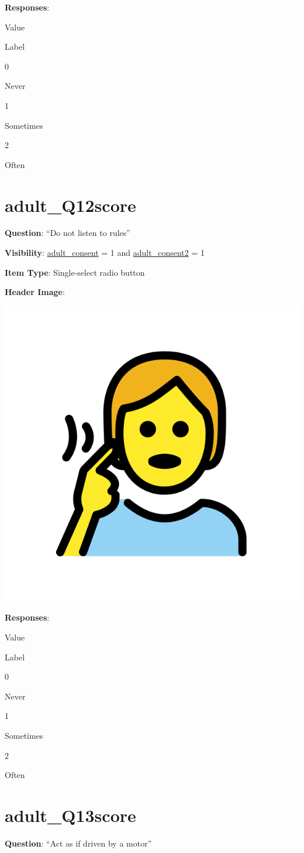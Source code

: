\documentclass[]{book}
\begin{document}
\textbf{Responses}:

Value

Label

0

Never

1

Sometimes

2

Often

\hypertarget{adult_q12score}{%
\section{adult\_Q12score}\label{adult_q12score}}

\textbf{Question}: ``Do not listen to rules''

\textbf{Visibility}: \protect\hyperlink{adult_consent}{adult\_consent} = 1 and \protect\hyperlink{adult_consent2}{adult\_consent2} = 1

\textbf{Item Type}: Single-select radio button

\textbf{Header Image}:

\begin{flushleft}\includegraphics[width=0.33\linewidth]{downloadFigs4latex_HBN_PMHS_Codebook/adult_Q12score_headerImg} \end{flushleft}

\textbf{Responses}:

Value

Label

0

Never

1

Sometimes

2

Often

\hypertarget{adult_q13score}{%
\section{adult\_Q13score}\label{adult_q13score}}

\textbf{Question}: ``Act as if driven by a motor''
\end{document}
